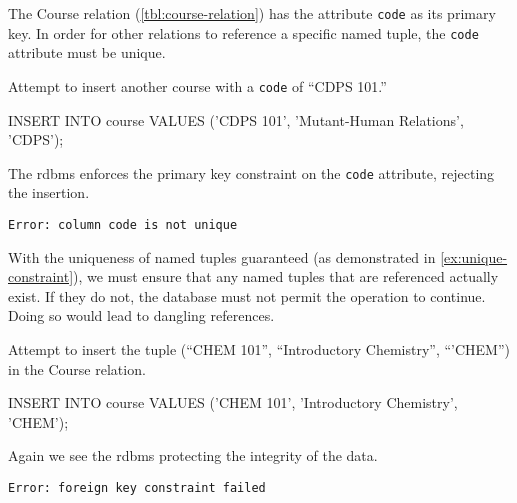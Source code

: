 			The Course relation (\vref{tbl:course-relation}) has the attribute \texttt{code} as its primary key.	In order for other relations to reference a specific named tuple, the \texttt{code} attribute must be unique.
			
			\begin{ex}
			\label{ex:unique-constraint}
				Attempt to insert another course with a \texttt{code} of ``CDPS 101.''
				
				\begin{singlespaced}
					\begin{sqlcode}
INSERT INTO course
VALUES      ('CDPS 101',
             'Mutant-Human Relations',
             'CDPS');
					\end{sqlcode}
				\end{singlespaced}
				
				The \gls{rdbms} enforces the primary key constraint on the \texttt{code} attribute, rejecting the insertion.
				
				\begin{verbatim}
Error: column code is not unique
				\end{verbatim}
			\end{ex}
			
			With the uniqueness of named tuples guaranteed (as demonstrated in \vref{ex:unique-constraint}), we must ensure that any named tuples that are referenced actually exist.  If they do not, the database must not permit the operation to continue.  Doing so would lead to dangling references.
			
			\begin{ex}
				Attempt to insert the tuple (``CHEM 101'', ``Introductory Chemistry'', ``'CHEM'') in the Course relation.
				
				\begin{singlespaced}
					\begin{sqlcode}
INSERT INTO course
VALUES      ('CHEM 101',
             'Introductory Chemistry',
             'CHEM');
					\end{sqlcode}
				\end{singlespaced}
				
				Again we see the \gls{rdbms} protecting the integrity of the data.
				
				\begin{verbatim}
Error: foreign key constraint failed
				\end{verbatim}
			\end{ex}
			
